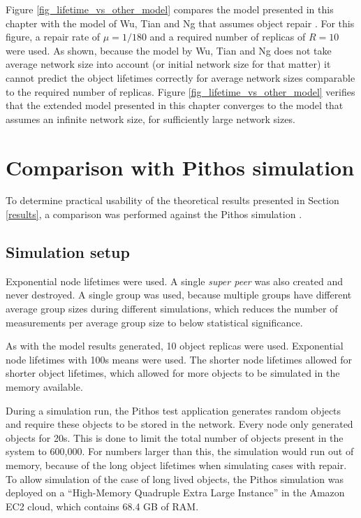 Figure \ref{fig_lifetime_vs_other_model} compares the model presented in this chapter with the model of Wu, Tian and Ng that assumes object repair \cite{replication_article}. For this figure, a repair rate of $\mu = 1/180$ and a required number of replicas of $R = 10$ were used. As shown, because the model by Wu, Tian and Ng does not take average network size into account (or initial network size for that matter) it cannot predict the object lifetimes correctly for average network sizes comparable to the required number of replicas. Figure \ref{fig_lifetime_vs_other_model} verifies that the extended model presented in this chapter converges to the model that assumes an infinite network size, for sufficiently large network sizes.

\section{Comparison with Pithos simulation}
\label{simulation}

To determine practical usability of the theoretical results presented in Section \ref{results}, a comparison was performed against the Pithos simulation \cite{Pithos_mmve_2011}.

\subsection{Simulation setup}

Exponential node lifetimes were used. A single \emph{super peer} was also created and never destroyed. A single group was used, because multiple groups have different average group sizes during different simulations, which reduces the number of measurements per average group size to below statistical significance.

As with the model results generated, 10 object replicas were used. Exponential node lifetimes with 100s means were used. The shorter node lifetimes allowed for shorter object lifetimes, which allowed for more objects to be simulated in the memory available.

During a simulation run, the Pithos test application generates random objects and require these objects to be stored in the network. Every node only generated objects for 20s. This is done to limit the total number of objects present in the system to 600,000. For numbers larger than this, the simulation would run out of memory, because of the long object lifetimes when simulating cases with repair. To allow simulation of the case of long lived objects, the Pithos simulation was deployed on a ``High-Memory Quadruple Extra Large Instance'' in the Amazon EC2 cloud, which contains 68.4 GB of RAM.


